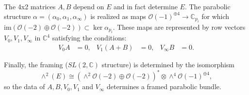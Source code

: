 \documentclass[]{article}
\newcommand{\C}{\mathbb{C}}
\newcommand{\OO}{\mathcal{O}}
\begin{document}
	The 4x2 matrices $A,B$ depend on $E$ and in fact determine $E$. The parabolic structure $\alpha = (\alpha_0,\alpha_1,\alpha_\infty)$ is realized as maps $\OO(-1)^{\oplus 4}\to \C_{p_i}$ for which $\text{im}\left(\OO(-2)\oplus\OO(-2)\right) \subset \ker\alpha_{p_i}$. These maps are represented by row vectors $V_0,V_1,V_\infty$ in $\C^4$ satisfying the conditions:
	\begin{align}
		V_0 A &=0, & V_1(A+B) &= 0, & V_\infty B &=0.
	\end{align}
	
	Finally, the framing ($SL(2,\C)$ structure) is determined by the isomorphism
	\begin{equation}
		\wedge^2 (E) \cong \left(\wedge^2 \OO(-2)\oplus \OO(-2)\right)^\ast\otimes \wedge^4\OO(-1)^{\oplus 4},
	\end{equation}
	so the data of $A,B, V_0,V_1$ and $V_\infty$ determines a framed parabolic bundle.
	
\end{document}
